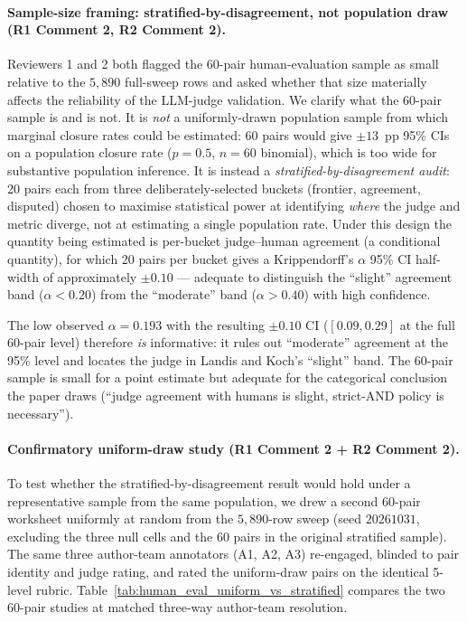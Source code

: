 \paragraph{Sample-size framing: stratified-by-disagreement, not population draw (R1 Comment 2, R2 Comment 2).}
Reviewers 1 and 2 both flagged the 60-pair human-evaluation sample as small relative to the $5{,}890$ full-sweep rows and asked whether that size materially affects the reliability of the LLM-judge validation. We clarify what the 60-pair sample is and is not. It is \emph{not} a uniformly-drawn population sample from which marginal closure rates could be estimated: 60 pairs would give $\pm 13$~pp 95\% CIs on a population closure rate ($p = 0.5$, $n = 60$ binomial), which is too wide for substantive population inference. It is instead a \emph{stratified-by-disagreement audit}: 20 pairs each from three deliberately-selected buckets (frontier, agreement, disputed) chosen to maximise statistical power at identifying \emph{where} the judge and metric diverge, not at estimating a single population rate. Under this design the quantity being estimated is per-bucket judge--human agreement (a conditional quantity), for which 20 pairs per bucket gives a Krippendorff's $\alpha$ 95\% CI half-width of approximately $\pm 0.10$ --- adequate to distinguish the ``slight'' agreement band ($\alpha < 0.20$) from the ``moderate'' band ($\alpha > 0.40$) with high confidence.

The low observed $\alpha = 0.193$ with the resulting $\pm 0.10$ CI ($[0.09, 0.29]$ at the full 60-pair level) therefore \emph{is} informative: it rules out ``moderate'' agreement at the 95\% level and locates the judge in Landis and Koch's ``slight'' band. The 60-pair sample is small for a point estimate but adequate for the categorical conclusion the paper draws (``judge agreement with humans is slight, strict-AND policy is necessary'').

\paragraph{Confirmatory uniform-draw study (R1 Comment 2 + R2 Comment 2).}
To test whether the stratified-by-disagreement result would hold under a representative sample from the same population, we drew a second 60-pair worksheet uniformly at random from the $5{,}890$-row sweep (seed $20261031$, excluding the three null cells and the 60 pairs in the original stratified sample). The same three author-team annotators (A1, A2, A3) re-engaged, blinded to pair identity and judge rating, and rated the uniform-draw pairs on the identical 5-level rubric. Table~\ref{tab:human_eval_uniform_vs_stratified} compares the two 60-pair studies at matched three-way author-team resolution.


